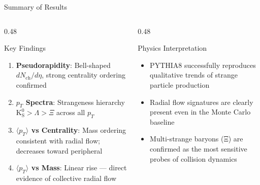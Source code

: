 \documentclass[10pt, aspectratio=169]{beamer}
\begin{document}
\begin{frame}{Summary of Results}

  \begin{columns}
    \begin{column}{0.48\textwidth}
      \begin{block}{Key Findings}
        \begin{enumerate}
          \item \textbf{Pseudorapidity}: Bell-shaped $dN_\mathrm{ch}/d\eta$, strong centrality ordering confirmed
          \item \textbf{$p_T$ Spectra}: Strangeness hierarchy $\mathrm{K^0_S} > \Lambda > \Xi$ across all $p_T$
          \item \textbf{$\langle p_T \rangle$ vs Centrality}: Mass ordering consistent with radial flow; decreases toward peripheral
          \item \textbf{$\langle p_T \rangle$ vs Mass}: Linear rise — direct evidence of collective radial flow
        \end{enumerate}
      \end{block}
    \end{column}
    \begin{column}{0.48\textwidth}
      \begin{alertblock}{Physics Interpretation}
        \begin{itemize}
          \item PYTHIA8 successfully reproduces qualitative trends of strange particle production
          \item Radial flow signatures are clearly present even in the Monte Carlo baseline
          \item Multi-strange baryons (Ξ) are confirmed as the most sensitive probes of collision dynamics
        \end{itemize}
      \end{alertblock}
    \end{column}
  \end{columns}

\end{frame}
\end{document}

